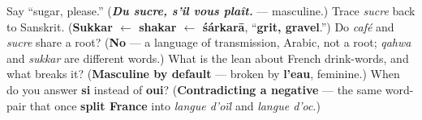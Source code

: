 \begin{tcolorbox}[breakable,colback=teal!4,colframe=teal!35!black,title={Before you move on}]
Say \textquotedblleft{}sugar, please.\textquotedblright{} (\emph{\textbf{Du sucre, s'il vous plaît.}} — masculine.) Trace \emph{sucre} back to Sanskrit. (\textbf{Sukkar $\leftarrow$ shakar $\leftarrow$ śárkarā}, \textquotedblleft{}\textbf{grit, gravel}.\textquotedblright{}) Do \emph{café} and \emph{sucre} share a root? (\textbf{No} — a language of transmission, Arabic, not a root; \emph{qahwa} and \emph{sukkar} are different words.) What is the lean about French drink-words, and what breaks it? (\textbf{Masculine by default} — broken by \textbf{l'eau}, feminine.) When do you answer \textbf{si} instead of \textbf{oui}? (\textbf{Contradicting a negative} — the same word-pair that once \textbf{split France} into \emph{langue d'oïl} and \emph{langue d'oc}.)
\end{tcolorbox}
